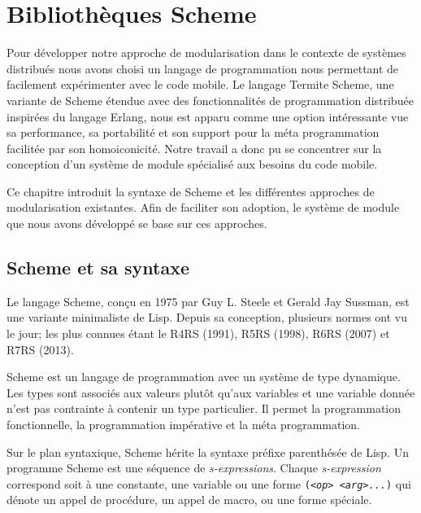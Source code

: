 
\chapter{Bibliothèques Scheme}

Pour développer notre approche de modularisation dans le contexte de
systèmes distribués nous avons choisi un langage de programmation nous
permettant de facilement expérimenter avec le code mobile.  Le langage
Termite Scheme, une variante de Scheme étendue avec des
fonctionnalités de programmation distribuée inspirées du langage
Erlang, nous est apparu comme une option intéressante vue sa
performance, sa portabilité et son support pour la méta programmation
facilitée par son homoiconicité.  Notre travail a donc pu se concentrer
sur la conception d'un système de module spécialisé aux besoins du
code mobile.

Ce chapitre introduit la syntaxe de Scheme et les différentes
approches de modularisation existantes.  Afin de faciliter son
adoption, le système de module que nous avons développé se base sur
ces approches.


\section{Scheme et sa syntaxe}

Le langage Scheme\cite{Clinger:2008:SCH:1529966.1529973}, conçu en 1975 par Guy
L. Steele et Gerald Jay Sussman, est une variante minimaliste de Lisp.
Depuis sa conception, plusieurs normes ont vu le jour; les plus connues
étant le R4RS (1991), R5RS (1998), R6RS (2007) et R7RS (2013).

Scheme est un langage de programmation avec un
système de type dynamique.  Les types sont associés aux valeurs plutôt qu'aux
variables et une variable donnée n'est pas contrainte à contenir un type
particulier.  Il permet la programmation fonctionnelle, la programmation
impérative et la méta programmation.

Sur le plan syntaxique, Scheme hérite la
syntaxe préfixe parenthésée de Lisp.  Un programme Scheme est une séquence de
\textit{s-expressions}.  Chaque \textit{s-expression} correspond soit à une
constante, une variable ou une forme \texttt{(\textit{<op>} \textit{<arg>...})}
qui dénote un appel de procédure, un appel de macro, ou une forme spéciale.

